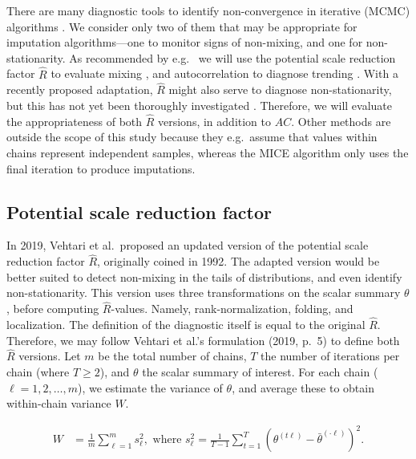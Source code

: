 \documentclass[Royal,times,sageh]{sagej}
\begin{document}
There are many diagnostic tools to identify non-convergence in iterative (MCMC) algorithms \citep{broo98, elad06}. We consider only two of them that may be appropriate for imputation algorithms---one to monitor signs of non-mixing, and one for non-stationarity. As recommended by e.g.~\citet{cowl96} we will use the potential scale reduction factor \(\widehat{R}\) to evaluate mixing \citep[`Gelman-Rubin statistic';][]{gelm92}, and autocorrelation to diagnose trending \citep[\(AC\);][]{scha97, gelm13}. With a recently proposed adaptation, \(\widehat{R}\) might also serve to diagnose non-stationarity, but this has not yet been thoroughly investigated \citep{veht19}. Therefore, we will evaluate the appropriateness of both \(\widehat{R}\) versions, in addition to \(AC\). Other methods are outside the scope of this study because they e.g.~assume that values within chains represent independent samples, whereas the MICE algorithm only uses the final iteration to produce imputations.

\hypertarget{potential-scale-reduction-factor}{%
\subsection{Potential scale reduction factor}\label{potential-scale-reduction-factor}}

In 2019, Vehtari et al.~proposed an updated version of the potential scale reduction factor \(\widehat{R}\), originally coined in 1992. The adapted version would be better suited to detect non-mixing in the tails of distributions, and even identify non-stationarity. This version uses three transformations on the scalar summary \(\theta\), before computing \(\widehat{R}\)-values. Namely, rank-normalization, folding, and localization. The definition of the diagnostic itself is equal to the original \(\widehat{R}\). Therefore, we may follow Vehtari et al.'s formulation (2019, p.~5) to define both \(\widehat{R}\) versions. Let \(m\) be the total number of chains, \(T\) the number of iterations per chain (where \(T\geq2\)), and \(\theta\) the scalar summary of interest. For each chain (\(\ell = 1, 2, \dots, m\)), we estimate the variance of \(\theta\), and average these to obtain within-chain variance \(W\).

\begin{align*}
W&=\frac{1}{m} \sum_{\ell=1}^{m} s_{\ell}^{2}, \text { where } s_{\ell}^{2}=\frac{1}{T-1} \sum_{t=1}^{T}\left(\theta^{(t \ell)}-\bar{\theta}^{(\cdot \ell)}\right)^{2}. 
\end{align*}
\end{document}
